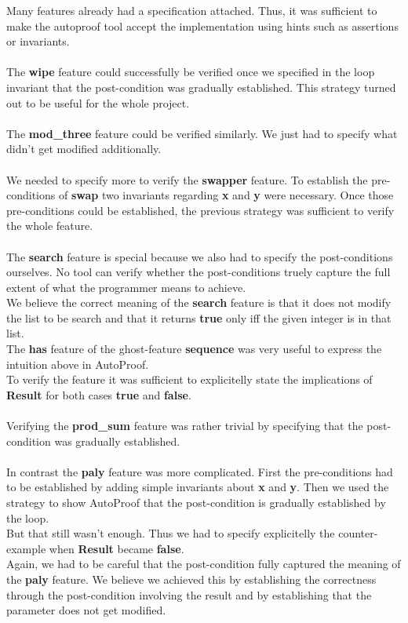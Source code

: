 \documentclass{report}
\begin{document}
Many features already had a specification attached. Thus, it was sufficient to
make the autoproof tool accept the implementation using hints such as assertions
or invariants.
\\
\\
The \textbf{wipe} feature could successfully be verified once we specified in the loop
invariant that the post-condition was gradually established. This strategy
turned out to be useful for the whole project.
\\
\\
The \textbf{mod\_three} feature could be verified similarly. We just had to
specify what didn't get modified additionally.
\\
\\
We needed to specify more to verify the \textbf{swapper} feature. To establish
the pre-conditions of \textbf{swap} two invariants regarding \textbf{x} and
\textbf{y} were necessary. Once those pre-conditions could be established, the
previous strategy was sufficient to verify the whole feature.
\\
\\
The \textbf{search} feature is special because we also had to specify the 
post-conditions ourselves. No tool can verify whether the post-conditions truely
capture the full extent of what the programmer means to achieve.\\
We believe the correct meaning of the \textbf{search} feature is that it does
not modify the list to be search and that it returns \textbf{true} only iff
the given integer is in that list.\\
The \textbf{has} feature of the ghost-feature \textbf{sequence} was very useful
to express the intuition above in AutoProof.\\
To verify the feature it was sufficient to explicitelly state the implications
of \textbf{Result} for both cases \textbf{true} and \textbf{false}.
\\
\\
Verifying the \textbf{prod\_sum} feature was rather trivial by specifying that
the post-condition was gradually established.
\\
\\
In contrast the \textbf{paly} feature was more complicated. First the pre-conditions
had to be established by adding simple invariants about \textbf{x} and \textbf{y}.
Then we used the strategy to show AutoProof that the post-condition is gradually
established by the loop.\\
But that still wasn't enough. Thus we had to specify explicitelly the counter-example
when \textbf{Result} became \textbf{false}.\\
Again, we had to be careful that the post-condition fully captured the meaning
of the \textbf{paly} feature. We believe we achieved this by establishing the
correctness through the post-condition involving the result and by establishing
that the parameter does not get modified.
\end{document}

